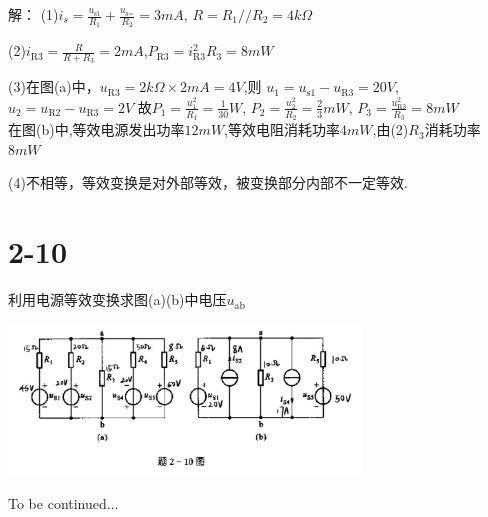 \documentclass{article}
\begin{document}
\noindent 解：
(1)$i_s=\frac{u_\text{s1}}{R_1}+\frac{u_\text{s=}}{R_2}=3mA$,
$R=R_1//R_2=4k\Omega$

(2)$i_\text{R3}=\frac{R}{R+R_3}=2mA$,$P_\text{R3}=i_\text{R3}^2R_3=8mW$

(3)在图(a)中，$u_\text{R3}=2k\Omega\times2mA=4V$,则
$u_1=u_\text{s1}-u_\text{R3}=20V$,$u_2=u_\text{R2}-u_\text{R3}=2V$
故$P_1=\frac{u_1^2}{R_1}=\frac{1}{30}W$,
$P_2=\frac{u_2^2}{R_2}=\frac{2}{3}mW$,
$P_3=\frac{u_\text{R3}^2}{R_3}=8mW$\\
在图(b)中,等效电源发出功率$12mW$,等效电阻消耗功率$4mW$,由(2)$R_3$消耗功率$8mW$

(4)不相等，等效变换是对外部等效，被变换部分内部不一定等效.
\section*{2-10}
利用电源等效变换求图(a)(b)中电压$u_\text{ab}$
\begin{center}
\includegraphics[width=0.7\textwidth,height=0.2\textheight]{2-10.jpg}
\end{center}
To be continued...
\end{document}
